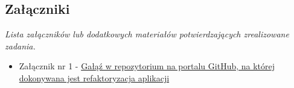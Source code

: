 \documentclass[12pt,a4paper,oneside]{article}
\theoremstyle{definition}
\numberwithin{equation}{section}
\begin{document}
\subsection{Załączniki}
\textit{Lista załączników lub dodatkowych materiałów potwierdzających zrealizowane zadania.}
\begin{itemize}
	\item Załącznik nr 1 - \href{https://github.com/lukaszgo1/engineering_project_2022/tree/mvp}{Gałąź w repozytorium na portalu GitHub, na której dokonywana jest refaktoryzacja aplikacji}
\end{itemize}


\renewcommand\refname{Literatura (jeżeli wymagana)}

\end{document}
